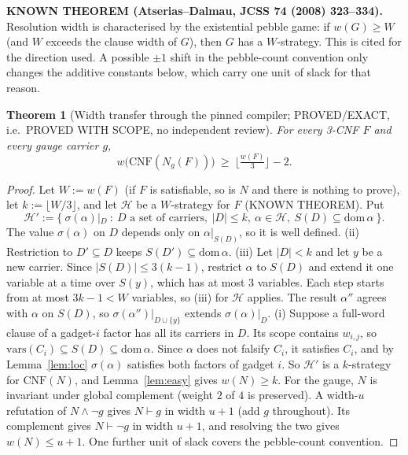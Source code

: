 \documentclass[11pt]{article}
\newtheorem{theorem}{Theorem}
\theoremstyle{definition}
\begin{document}
\noindent\textbf{KNOWN THEOREM (Atserias--Dalmau, JCSS 74 (2008) 323--334).} Resolution width is characterised by the existential pebble game: if $w(G)\ge W$ (and $W$ exceeds the clause width of $G$), then $G$ has a $W$-strategy. This is cited for the direction used. A possible $\pm1$ shift in the pebble-count convention only changes the additive constants below, which carry one unit of slack for that reason.

\begin{theorem}[Width transfer through the pinned compiler; PROVED/EXACT, i.e.\ PROVED WITH SCOPE, no independent review]\label{thm:transfer}
For every 3-CNF $F$ and every gauge carrier $g$,
\[ w\big(\mathrm{CNF}(N_g(F))\big)\ \ge\ \Big\lfloor \tfrac{w(F)}{3}\Big\rfloor-2 .\]
\end{theorem}
\begin{proof}
Let $W:=w(F)$ (if $F$ is satisfiable, so is $N$ and there is nothing to prove), let $k:=\lfloor W/3\rfloor$, and let $\mathcal H$ be a $W$-strategy for $F$ (KNOWN THEOREM). Put
\[\mathcal H' := \{\ \sigma(\alpha)|_D\ :\ D \text{ a set of carriers},\ |D|\le k,\ \alpha\in\mathcal H,\ S(D)\subseteq\mathrm{dom}\,\alpha\ \}.\]
The value $\sigma(\alpha)$ on $D$ depends only on $\alpha|_{S(D)}$, so it is well defined.
(ii) Restriction to $D'\subseteq D$ keeps $S(D')\subseteq\mathrm{dom}\,\alpha$.
(iii) Let $|D|<k$ and let $y$ be a new carrier. Since $|S(D)|\le 3(k-1)$, restrict $\alpha$ to $S(D)$ and extend it one variable at a time over $S(y)$, which has at most 3 variables. Each step starts from at most $3k-1<W$ variables, so (iii) for $\mathcal H$ applies. The result $\alpha''$ agrees with $\alpha$ on $S(D)$, so $\sigma(\alpha'')|_{D\cup\{y\}}$ extends $\sigma(\alpha)|_D$.
(i) Suppose a full-word clause of a gadget-$i$ factor has all its carriers in $D$. Its scope contains $w_{i,j}$, so $\mathrm{vars}(C_i)\subseteq S(D)\subseteq\mathrm{dom}\,\alpha$. Since $\alpha$ does not falsify $C_i$, it satisfies $C_i$, and by Lemma~\ref{lem:loc} $\sigma(\alpha)$ satisfies both factors of gadget $i$.
So $\mathcal H'$ is a $k$-strategy for $\mathrm{CNF}(N)$, and Lemma~\ref{lem:easy} gives $w(N)\ge k$.
For the gauge, $N$ is invariant under global complement (weight $2$ of $4$ is preserved). A width-$u$ refutation of $N\wedge\neg g$ gives $N\vdash g$ in width $u+1$ (add $g$ throughout). Its complement gives $N\vdash\neg g$ in width $u+1$, and resolving the two gives $w(N)\le u+1$. One further unit of slack covers the pebble-count convention.
\end{proof}
\end{document}
